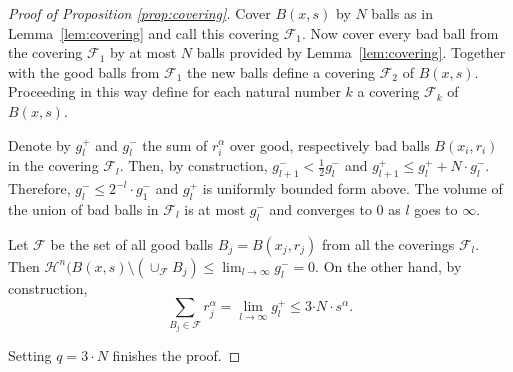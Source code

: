 \documentclass[12pt,leqno,intlimits]{amsart}
\numberwithin{equation}{section}
\theoremstyle{definition}
\theoremstyle{remark}
\newcommand{\lref}[1]{Lemma~\ref{#1}}
\begin{document}
\begin{proof}[Proof of Proposition \ref{prop:covering}]
Cover $B (x,{s})$ by $N$ balls as in \lref{lem:covering} and call this covering $\mathcal F_1$. Now cover every bad
ball from the covering $\mathcal F_1$ by at most $N$ balls provided by \lref{lem:covering}. Together with the good balls from $\mathcal F_1$ the new balls define a covering $\mathcal F_2$ of $B (x,s)$. Proceeding in this way define for each natural number $k$ a covering $\mathcal F_k$ of $B(x,s)$.

Denote by $g_l^{+}$ and $g_l ^-$ the sum of $r_i ^{\alpha}$ over good, respectively bad balls $B (x_i,{r_i})$ in the covering $\mathcal F_l$.
Then, by construction, $g_{l+1} ^- < \frac 1 2 g_l ^-$ and $g_{l+1} ^+ \leq g_l ^+ + N\cdot g_l ^-$. Therefore, $g_l^- \leq 2^{-l} \cdot g_1 ^-$
and $g_l^+$ is uniformly bounded form above.
The volume of the union of bad balls in $\mathcal F_l$ is at most $g_l^-$ and converges to $0$ as $l$ goes to $\infty$.

Let $\mathcal F$ be the set of all good balls $B_j =B (x_j,{r_j})$ from all the coverings $\mathcal F_l$.
Then $\mathcal H^n (B (x,s) \setminus (\cup _{\mathcal F} B_j ) \leq \lim _{l\to \infty} g_l ^- =0$. On the other hand,
by construction,
\[\sum_{B_j\in \mathcal F} r_j^{\alpha}
= \lim _{l\to \infty} g_l^+
\leq 3{\cdot N}{\cdot} s^{\alpha}.\]

 Setting $q=3\cdot N$ finishes the proof.
\end{proof}
\end{document}
